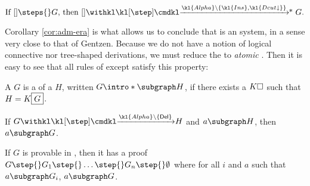 \begin{scope}
\begin{corollary}\label{cor:adm-ins}
  $$
  \text{If $[] \steps{} G$, then $[]
  \xsteps{\kl{Alpha}\setminus\{\kl{Ins},\kl{Dcut{\da}}\}} G$.}
  $$
\end{corollary}

Corollary \ref{cor:adm-era} is what allows us to conclude that  is an
\emph{} system, in a sense very close to that of Gentzen. Because we do
not have a notion of logical connective nor tree-shaped derivations, we must
reduce the  to \emph{atomic} . Then it is easy to see
that all rules of  except  satisfy this property:

\begin{definition}[Subgraph]
  A  $G$ is a  of a  $H$, written $G \intro*\subgraph
  H$, if there exists a  $K\square$ such that $H = K\fbox{$G$}$.
\end{definition}

\begin{fact}
  If $G \xstep{\kl{Alpha} \setminus \{\mathsf{Del}\}} H$ and $a \subgraph H$,
  then $a \subgraph G$.
\end{fact}

\begin{corollary}[Analyticity]
  If $G$ is provable in , then it has a proof $G \step{} G_1 \step{}
  \ldots \step{} G_n \step{} \emptyset$ where for all $i$ and $a$ such that $a
  \subgraph G_i$, $a \subgraph G$.
\end{corollary}



\end{scope}



